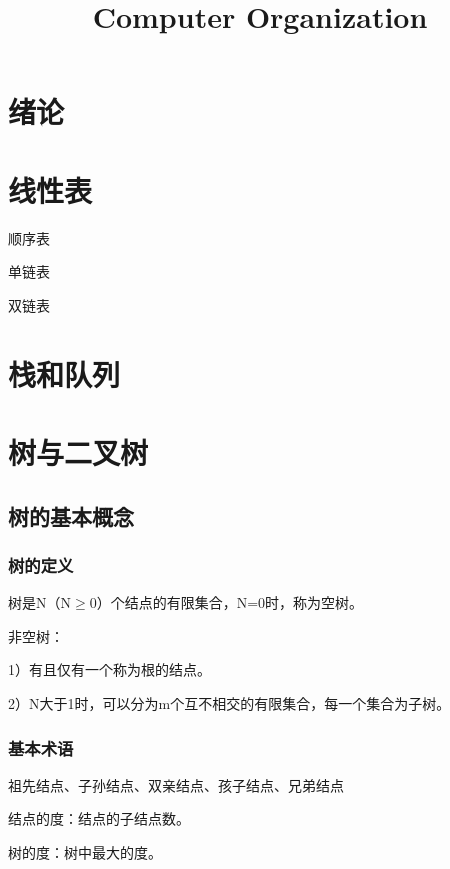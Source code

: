 \documentclass{ctexart}
\title{Computer Organization}
\author{}
\date{}
\begin{document}
\maketitle

\newpage

\tableofcontents




\section{绪论}

\section{线性表}

顺序表

单链表

双链表

\section{栈和队列}


\section{树与二叉树}



\subsection{树的基本概念}


\subsubsection{树的定义}

树是N（N$\geq$0）个结点的有限集合，N=0时，称为空树。

非空树：

1）有且仅有一个称为根的结点。

2）N大于1时，可以分为m个互不相交的有限集合，每一个集合为子树。


\subsubsection{基本术语}

祖先结点、子孙结点、双亲结点、孩子结点、兄弟结点

结点的度：结点的子结点数。

树的度：树中最大的度。
\end{document}
